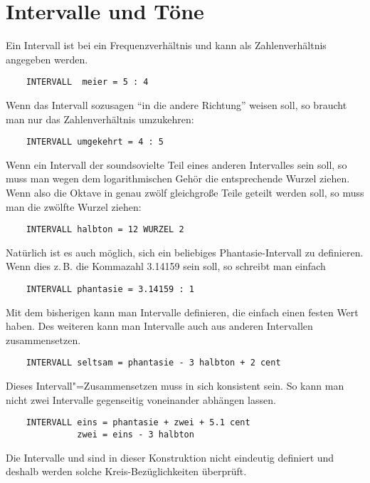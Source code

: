 \section{Intervalle und Töne}\label{sec:intervalle-und-tone}
Ein Intervall ist bei \mutabor{} ein Frequenzverhältnis und kann
als Zahlenverhältnis angegeben werden. 
\begin{verbatim}
    INTERVALL  meier = 5 : 4
\end{verbatim}
Wenn das Intervall sozusagen "`in die andere Richtung"' weisen
soll, so braucht man nur das 
Zahlenverhältnis umzukehren:
\begin{verbatim}
    INTERVALL umgekehrt = 4 : 5
\end{verbatim}
Wenn ein Intervall der soundsovielte Teil eines anderen
Intervalles sein soll, so muss man wegen dem logarithmischen
Gehör die entsprechende Wurzel ziehen. Wenn also die Oktave in
genau zwölf gleichgroße Teile geteilt werden soll, so muss
man die zwölfte Wurzel ziehen:
\begin{verbatim}
    INTERVALL halbton = 12 WURZEL 2
\end{verbatim}
Natürlich ist es auch möglich, sich ein beliebiges 
Phantasie-Intervall zu definieren. Wenn dies z.\,B. die Kommazahl
3.14159 sein soll, so schreibt man einfach
\begin{verbatim}
    INTERVALL phantasie = 3.14159 : 1
\end{verbatim}
Mit dem bisherigen kann man Intervalle definieren, die einfach
einen festen Wert haben. Des weiteren kann man Intervalle auch aus
anderen Intervallen zusammensetzen.
\begin{verbatim}
    INTERVALL seltsam = phantasie - 3 halbton + 2 cent
\end{verbatim}
Dieses Intervall"=Zusammensetzen muss in sich konsistent sein.
So kann man nicht zwei Intervalle gegenseitig voneinander abhängen
lassen.
\begin{verbatim}
    INTERVALL eins = phantasie + zwei + 5.1 cent
              zwei = eins - 3 halbton
\end{verbatim}
Die Intervalle  und  sind in dieser
Konstruktion nicht eindeutig definiert und deshalb werden
solche Kreis-Bezüglichkeiten überprüft.

